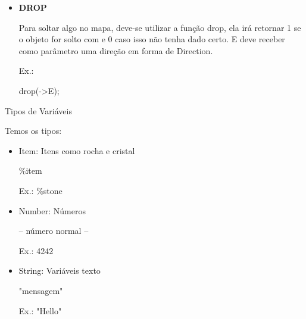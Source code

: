 \documentclass[a4paper]{article}
\begin{document}
{{{{{{{{{\begin{itemize}
            \textcolor{NavyBlue}{Ex.:}
            
            drag(->NW);

        \bigskip
                
        \item \textbf{DROP}
        
            Para soltar algo no mapa, deve-se utilizar 
            a função
            \textcolor{NavyBlue}{drop},
            ela irá retornar 1 se o objeto for solto com
            e 0 caso isso não tenha dado certo.
            E deve receber como parâmetro uma direção
            em forma de Direction.

            \textcolor{NavyBlue}{Ex.:}
            
            drop(->E);
            
        \end{itemize}

\newpage %


{\textcolor{NavyBlue}{\LARGE Tipos de Variáveis}

    \bigskip
    \bigskip
    
    Temos os tipos:
        
    \begin{itemize}
        
        \item \textcolor{NavyBlue}{Item:} Itens como rocha e cristal
            
            \%item
            
            \textcolor{NavyBlue}{Ex.:} \%stone
                
        \bigskip
        
        \item \textcolor{NavyBlue}{Number:} Números
            
            -- número normal --
            
            \textcolor{NavyBlue}{Ex.:} 4242
            
        \bigskip            
            
        \item \textcolor{NavyBlue}{String:} Variáveis texto
            
            "mensagem"
            
            \textcolor{NavyBlue}{Ex.:} "Hello"         
        
        \bigskip
                         

\end{itemize}}}}}}}}}}}
\end{document}
